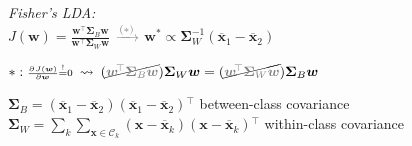\emph{Fisher's LDA:}
\\\vspace{-5pt}\hfill
$J(\bm w) = \frac{\bm w\!^\top \bm\Sigma_B \bm w}{\bm w\!^\top \bm\Sigma_W \bm w}$
\enskip$\xrightarrow{\color{gray}(\ast)}$\enskip
$\bm w^\ast \propto \bm\Sigma_W^{-1} (\overline{\bm x}_1 - \overline{\bm x}_2)$

{\everymath\expandafter{\the\everymath\color{gray}}
\enskip $\ast :
    {\scriptstyle \pderiv{J(\bm w)}{\bm w} \overset!= 0}
    \:\rightsquigarrow\:
    (\cancel{\color{gray} \bm w\!^\top \bm\Sigma_B \bm w}) \bm\Sigma_W \bm w =
    (\cancel{\color{gray} \bm w\!^\top \bm\Sigma_W \bm w}) \bm\Sigma_B \bm w
$}

$\bm\Sigma_B = (\overline{\bm x}_1 - \overline{\bm x}_2) (\overline{\bm x}_1 - \overline{\bm x}_2)\!^\top$
    \hfill{\scriptsize between-class covariance}\\
$\bm\Sigma_W \!= \sum_k \sum_{\bm x \in \mathcal C_k} (\bm x - \overline{\bm x}_k) (\bm x - \overline{\bm x}_k)\!^\top$\!\!
    \hfill{\scriptsize within-class covariance}

\iffalse
    \emph{Fisher's linear discriminant:}
    Find projection that max. the distance of the projections \;AND\; min. the variance
    $\Rightarrow \max_w \frac{(\bm w^\top (\overline{\bm x}_0 - \overline{\bm x}_1))^2}{\widetilde{\mathrm{Var}}(\bm w^\top C_0) + \widetilde{\mathrm{Var}}(\bm w^\top C_1)}$
    \\\enskip
    where $\widetilde{\mathrm{Var}}(\bm w^\top C_i) = \sum_{i\in C_i} (\bm w^\top \bm x_i - \bm w^\top \overline{\bm x}_0)^2$.
    \\
    Solution: $\bm w^\ast \propto S_{\bm W}^{-1} (\overline{\bm x}_0 - \overline{\bm x}_1)$
    where $S_{\bm W} = \widetilde{\mathrm{Var}}(C_0) + \widetilde{\mathrm{Var}}(C_1)$
\fi

